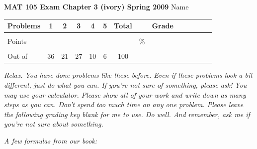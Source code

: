 \documentclass[12pt]{article}
\begin{document}
{\bf MAT 105 Exam Chapter 3 (ivory) Spring 2009} \hspace{.4in} {\large Name} \hrulefill

\hrulefill


\begin{center}

\begin{tabular}
{|l|c|c|c|c|c|c|c|c|c|c|c|c|c|} \hline

 Problems & \hspace{5 pt} 1 \hspace{5 pt}  & \hspace{5 pt} 2 \hspace{5 pt} & \hspace{5 pt} 3 \hspace{5 pt} & \hspace{5 pt} 4 \hspace{5 pt} & \hspace{5 pt} 5 \hspace{5 pt} &  \hspace{5 pt} Total  \hspace{5 pt} & &  \hspace{5 pt} Grade \hspace{5 pt}  \\ \hline
&&&&&& &&\\  
Points &&&&&& &    \hspace{.8in}\% &  \\ 
&&&&& &&& \\  \hline
Out of & 36  & 21 & 27 & 10 & 6 &100 & & \\ \hline

\end {tabular}
 
\end{center}
 \emph{Relax.  You have done problems like these before.  Even if these problems look a bit different, just do what you can.  If you're not sure of something, please ask! You may use your calculator.  Please show all of your work and write down as many steps as you can.  Don't spend too much time on any one problem.  Please leave the following grading key blank for me to use.  Do well.  And remember, ask me if you're not sure about something.}
 
 \vspace{.1 in}
 
 \emph{A few formulas from our book:}
  \vspace{.2in}
 
 \hrulefill
 
\end{document}
